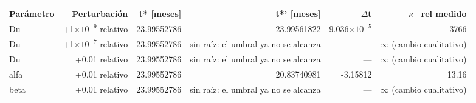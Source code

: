 {\footnotesize
\begin{longtable}{lrrrrr}
\toprule
\textbf{Parámetro} & \textbf{Perturbación} & \textbf{t* [meses]} & \textbf{t*' [meses]} & \textbf{$\Delta$t} & \textbf{$\kappa$\_rel medido} \\
\midrule
\endhead
Du & +1$\times10^{-9}$ relativo & 23.99552786 & 23.99561822 & 9.036$\times10^{-5}$ & 3766 \\
Du & +1$\times10^{-7}$ relativo & 23.99552786 & sin raíz: el umbral ya no se alcanza & — & $\infty$ (cambio cualitativo) \\
Du & +0.01 relativo & 23.99552786 & sin raíz: el umbral ya no se alcanza & — & $\infty$ (cambio cualitativo) \\
alfa & +0.01 relativo & 23.99552786 & 20.83740981 & -3.15812 & 13.16 \\
beta & +0.01 relativo & 23.99552786 & sin raíz: el umbral ya no se alcanza & — & $\infty$ (cambio cualitativo) \\
\bottomrule
\end{longtable}
}
